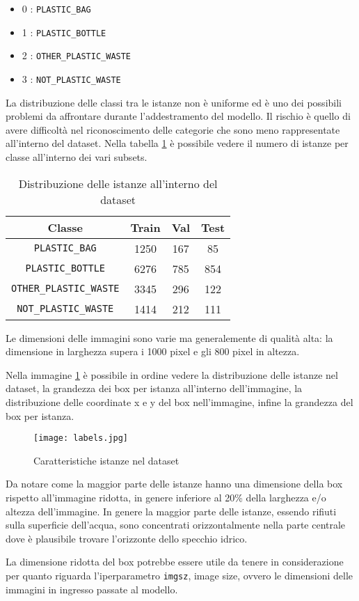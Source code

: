 \begin{itemize}
    \item 0 : \verb+PLASTIC_BAG+
    \item 1 : \verb+PLASTIC_BOTTLE+
    \item 2 : \verb+OTHER_PLASTIC_WASTE+
    \item 3 : \verb+NOT_PLASTIC_WASTE+
\end{itemize}

La distribuzione delle classi tra le istanze non è uniforme ed è uno dei possibili problemi da affrontare durante l'addestramento del modello.
Il rischio è quello di avere difficoltà nel riconoscimento delle categorie che sono meno rappresentate all'interno del dataset.
Nella tabella \ref{table:2} è possibile vedere il numero di istanze per classe all'interno dei vari subsets.

\begin{table}[h!]
    \centering
    \begin{tabular}{ |c|c|c|c| } 
    \hline
    \textbf{Classe} & \textbf{Train} & \textbf{Val} & \textbf{Test} \\ 
    \hline
    \verb+PLASTIC_BAG+ & 1250 & 167 & 85 \\ 
    \verb+PLASTIC_BOTTLE+ & 6276 & 785 & 854 \\ 
    \verb+OTHER_PLASTIC_WASTE+ & 3345 & 296 & 122 \\ 
    \verb+NOT_PLASTIC_WASTE+ & 1414 & 212 & 111 \\
    \hline
    \end{tabular}
    \caption{Distribuzione delle istanze all'interno del dataset}
\label{table:2}
\end{table}

Le dimensioni delle immagini sono varie ma generalemente di qualità alta: la dimensione in larghezza supera i 1000 pixel e gli 800 pixel in altezza.

Nella immagine \ref{fig:1} è possibile in ordine vedere la distribuzione delle istanze nel dataset, la grandezza dei box per istanza all'interno dell'immagine, la distribuzione delle coordinate x e y del box nell'immagine, infine la grandezza del box per istanza.

\begin{figure}[h]
    \centering
    \texttt{[image: labels.jpg]}
    \caption{Caratteristiche istanze nel dataset}
    \label{fig:1}
    \end{figure}

Da notare come la maggior parte delle istanze hanno una dimensione della box rispetto all'immagine ridotta, in genere inferiore al 20\% della larghezza e/o altezza dell'immagine. In genere la maggior parte delle istanze, essendo rifiuti sulla superficie dell'acqua, sono concentrati orizzontalmente nella parte centrale dove è plausibile trovare l'orizzonte dello specchio idrico.

La dimensione ridotta del box potrebbe essere utile da tenere in considerazione per quanto riguarda l'iperparametro \verb+imgsz+, image size, ovvero le dimensioni delle immagini in ingresso passate al modello.
